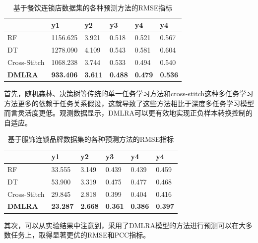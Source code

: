 \documentclass{llncs}
\begin{document}
\begin{table}[!hpt]
	\centering
	\caption{基于餐饮连锁店数据集的各种预测方法的RMSE指标}
	\label{tb:RMSEcanyin}
	\begin{tabular}{p{2cm}<{\centering}p{2cm}<{\centering}p{2cm}<{\centering}p{2cm}<{\centering}p{2cm}<{\centering}p{2cm}<{\centering}}
		\hline
		& \textbf{y1} & \textbf{y2} & \textbf{y3} & \textbf{y4} & \textbf{y4} \\ \hline
		RF & 1156.625 & 3.921 & 0.518 & 0.521 & 0.567 \\ %
		DT & 1278.090 & 4.109 & 0.543 & 0.581 & 0.604 \\ %
		Cross-Stitch & 1068.238 & 3.744 & 0.533 & 0.494 & 0.540 \\ \hline
		\textbf{DMLRA} & \textbf{933.406} & \textbf{3.611} & \textbf{0.488} & \textbf{0.479} & \textbf{0.536}                 \\ \hline
	\end{tabular}
\end{table}

首先，随机森林、决策树等传统的单一任务学习方法和cross-stitch这种多任务学习方法更多的依赖于任务关系假设，这就导致了这些方法相比于深度多任务学习模型而言灵活度更低。观测数据显示，DMLRA可以更有效地实现正负样本转换控制的自适应。

\begin{table}[!hpt]
	\centering
	\caption{基于服饰连锁品牌数据集的各种预测方法的RMSE指标}
	\label{tb:RMSEfushi}
	\begin{tabular}{p{2cm}<{\centering}p{2cm}<{\centering}p{2cm}<{\centering}p{2cm}<{\centering}p{2cm}<{\centering}p{2cm}<{\centering}}
		\hline
		& \textbf{y1} & \textbf{y2} & \textbf{y3} & \textbf{y4} & \textbf{y4} \\ \hline
		RF & 33.555 & 3.149 & 0.439 & 0.439 & 0.459 \\ %
		DT & 53.900 & 3.319 & 0.475 & 0.477 & 0.468 \\ %
		Cross-Stitch & 29.845 & 2.818 & 0.399 & 0.404 & 0.416 \\ \hline
		\textbf{DMLRA} & \textbf{23.287} & \textbf{2.668} & \textbf{0.361} & \textbf{0.386} & \textbf{0.397}                 \\ \hline
	\end{tabular}
\end{table}

其次，可以从实验结果中注意到，采用了DMLRA模型的方法进行预测可以在大多数任务上，取得显著更优的RMSE和PCC指标。
\end{document}
